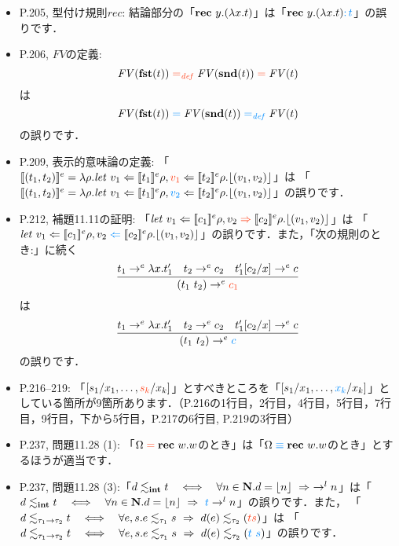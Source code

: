 \documentclass[12pt,titlepage,twoside,openright,dvipdfmx]{jsbook}
\newcommand\old[1]{%
  \textcolor[rgb]{1.0,0.25,0.1}{#1}%
  }
\newcommand\new[1]{%
  \textcolor[rgb]{0,0.55,1.0}{#1}%
  }
\theoremstyle{definition}
\begin{document}
\begin{itemize}
\item P.205, 型付け規則$\mathit{rec}$: 結論部分の「${\bf rec}\ {y.(\lambda x.t)}$」は「$\rec{y.(\lambda x.t)}\new{ \COL t}$」の誤りです．
\item P.206, $\mathit{FV}$の定義:
  \[
    \mathit{FV}(\fst(t)) \old{{}=_{\mathit{def}}{}} \mathit{FV}(\snd(t)) \old{{}={}} \mathit{FV}(t)
  \]
  は
  \[
    \mathit{FV}(\fst(t)) \new{{}={}} \mathit{FV}(\snd(t)) \new{{}=_{\mathit{def}}{}} \mathit{FV}(t)
  \]
  の誤りです．
\item P.209, 表示的意味論の定義:
  「$\eden{(t_1,t_2)} = \lambda\rho.{\it let}\ v_1\Leftarrow\eden{t_1}\rho, \old{v_1}\Leftarrow\eden{t_2}\rho.\floor{(v_1,v_2)}$」は
  「$\eden{(t_1,t_2)} = \lambda\rho.{\it let}\ v_1\Leftarrow\eden{t_1}\rho, \new{v_2}\Leftarrow\eden{t_2}\rho.\floor{(v_1,v_2)}$」の誤りです．
\item P.212, 補題11.11の証明:
  「$\mathit{let}\ v_1\Leftarrow\eden{c_1}\rho,v_2\old{{}\Rightarrow{}}\eden{c_2}\rho.\floor{(v_1,v_2)}$」は
  「$\mathit{let}\ v_1\Leftarrow\eden{c_1}\rho,v_2\new{{}\Leftarrow{}}\eden{c_2}\rho.\floor{(v_1,v_2)}$」の誤りです．また，「次の規則のとき:」に続く
   \[
     \infer{(t_1\ t_2)\to^e \old{c_1}}{
       t_1\to^e\lambda x.t'_1
       & t_2\to^e c_2
       & t'_1[c_2/x] \to^e c}
   \]
   は
   \[
     \infer{(t_1\ t_2)\to^e \new{c}}{
       t_1\to^e\lambda x.t'_1
       & t_2\to^e c_2
       & t'_1[c_2/x] \to^e c}
   \]
   の誤りです．
 \item P.216--219:
   「$[s_1/x_1,\ldots,\old{s_k}/x_k]$」とすべきところを「$[s_1/x_1,\ldots,\new{x_k}/x_k]$」としている箇所が9箇所あります．（P.216の1行目，2行目，4行目，5行目，7行目，9行目，下から5行目，P.217の6行目, P.219の3行目）
 \item P.237, 問題11.28 (1): 「$\Omega\old{{}={}}\rec{w.w}$のとき」は「$\Omega \new{{}\equiv{}} \rec{w.w}$のとき」とするほうが適当です．
 \item P.237, 問題11.28
   (3):「$d\lesssim_{\bf int} t \quad \Longleftrightarrow\quad \forall
   n\in{\bf N}.d=\lfloor{n}\rfloor \ \Rightarrow\ \to^l
   n$」は「$d\lesim_\typint t \quad \Longleftrightarrow\quad \forall
   n\in\Natu.d=\floor{n} \ \Rightarrow\ \new{t} \to^l n$」の誤りです．また，
   「$d\lesim_{\tau_1\typfun\tau_2}t \quad \Longleftrightarrow\quad
   \forall e,s.e\lesim_{\tau_1}s\ \Rightarrow\ d(e)\lesim_{\tau_2}(\old{t s})$」は
   「$d\lesim_{\tau_1\typfun\tau_2}t \quad \Longleftrightarrow\quad 
   \forall e,s.e\lesim_{\tau_1}s\ \Rightarrow\ d(e)\lesim_{\tau_2}(\new{t\ s})$」の誤りです．
\end{itemize}
\end{document}
